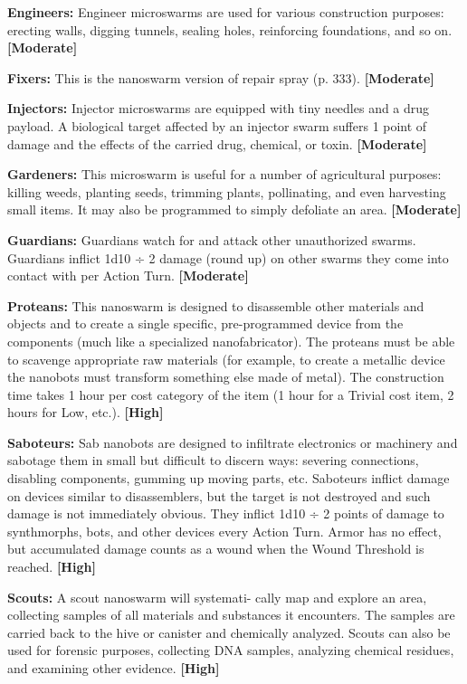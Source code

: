 \textbf{Engineers:} Engineer microswarms are used for 
various construction purposes: erecting walls, digging 
tunnels, sealing holes, reinforcing foundations, and so 
on. \textbf{[Moderate]}

\textbf{Fixers:} This is the nanoswarm version of repair 
spray (p. 333). \textbf{[Moderate]}

\textbf{Injectors:} Injector microswarms are equipped with 
tiny needles and a drug payload. A biological target 
affected by an injector swarm suffers 1 point of 
damage and the effects of the carried drug, chemical, 
or toxin. \textbf{[Moderate]}

\textbf{Gardeners:} This microswarm is useful for a number 
of agricultural purposes: killing weeds, planting seeds, 
trimming plants, pollinating, and even harvesting 
small items. It may also be programmed to simply 
defoliate an area. \textbf{[Moderate]}

\textbf{Guardians:} Guardians watch for and attack other 
unauthorized swarms. Guardians inflict 1d10 ÷ 2 
damage (round up) on other swarms they come into 
contact with per Action Turn. \textbf{[Moderate]}

\textbf{Proteans:} This nanoswarm is designed to disassemble 
other materials and objects and to create a single specific, 
pre-programmed device from the components (much 
like a specialized nanofabricator). The proteans must be 
able to scavenge appropriate raw materials (for example, 
to create a metallic device the nanobots must transform 
something else made of metal). The construction time 
takes 1 hour per cost category of the item (1 hour for a 
Trivial cost item, 2 hours for Low, etc.). \textbf{[High]}

\textbf{Saboteurs:} Sab nanobots are designed to infiltrate 
electronics or machinery and sabotage them in small 
but difficult to discern ways: severing connections, 
disabling components, gumming up moving parts, 
etc. Saboteurs inflict damage on devices similar to 
disassemblers, but the target is not destroyed and 
such damage is not immediately obvious. They inflict 
1d10 ÷ 2 points of damage to synthmorphs, bots, and 
other devices every Action Turn. Armor has no effect, 
but accumulated damage counts as a wound when the 
Wound Threshold is reached. \textbf{[High]}

\textbf{Scouts:} A scout nanoswarm will systemati-
cally map and explore an area, collecting samples 
of all materials and substances it encounters. The 
samples are carried back to the hive or canister 
and chemically analyzed. Scouts can also be used 
for forensic purposes, collecting DNA samples, 
analyzing chemical residues, and examining other 
evidence. \textbf{[High]}

